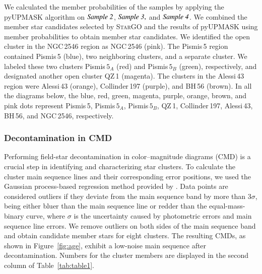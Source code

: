 \documentclass{aa} %
\begin{document}

We calculated the member probabilities of the samples by applying the pyUPMASK algorithm on 
{$\it Sample~2$}, {$\it Sample~3,$} and {$\it Sample~4$}. We combined the member star 
candidates selected by \textsc{StarGO} and the results of pyUPMASK using member
probabilities to obtain member star candidates. We identified the open cluster in the NGC\,2546 
region as NGC\,2546 (pink). The Pismis\,5 region contained Pismis\,5 (blue), two neighboring 
clusters, and a separate cluster. We labeled these two clusters Pismis$\,5_{A}$ (red) and Pismis$\,5_{B}$ (green), respectively, and designated another open cluster QZ\,1 (magenta). The clusters in the Alessi\,43 region were Alessi\,43 (orange), Collinder\,197 (purple), and BH\,56 (brown). In all the diagrams below, the blue, red, green, magenta, purple, orange, brown, and pink dots represent Pismis\,5, Pismis$\,5_{A}$, Pismis$\,5_{B}$, QZ\,1, Collinder\,197, Alessi\,43, BH\,56, and NGC\,2546, respectively. 

\subsubsection{Decontamination in CMD}

Performing field-star decontamination in color--magnitude diagrams (CMD) is a crucial step in identifying and characterizing star clusters. To calculate the cluster main sequence lines and their corresponding error positions, we used the Gaussian process-based regression method provided by \citet{2020ApJ...901...49L}. Data points are considered outliers if they deviate from the main sequence band by more than 3$\sigma$, being either bluer than the main sequence line or redder than the equal-mass-binary curve, where $\sigma$ is the uncertainty caused by photometric errors and main sequence line errors. We remove outliers on both sides of the main sequence band and
obtain candidate member stars for eight clusters. The resulting CMDs, as shown in Figure~\ref{fig:age}, exhibit a low-noise main sequence after decontamination. Numbers for the cluster members are displayed in the second column of Table~\ref{tab:table1}.
\end{document}
